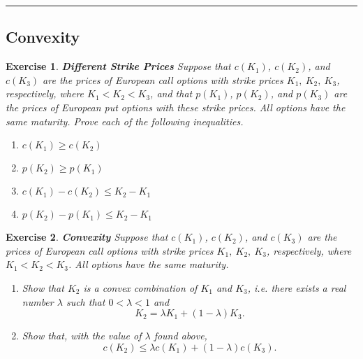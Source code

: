 \documentclass[letterpaper,10pt]{article}
\newtheorem{ex}{Exercise}
\begin{document}
\bigskip

\hrule

\bigskip

\subsection{Convexity}


\begin{ex} {\bf Different Strike Prices}
Suppose that $c(K_1)$, $c(K_2)$, and $c(K_3)$ are the prices of European call options with strike prices $K_1,~K_2,~K_3$, respectively, where $K_1<K_2<K_3$, and that $p(K_1)$, $p(K_2)$, and $p(K_3)$ are the prices of European put options with these strike prices.  All options have the same maturity.  Prove each of the following inequalities.

\begin{enumerate}

\item[(a)] $c(K_1)\geq c(K_2)$

\item[(b)] $p(K_2)\geq p(K_1)$

\item[(c)] $c(K_1)-c(K_2)\leq K_2-K_1$

\item[(d)] $p(K_2)-p(K_1)\leq K_2-K_1$





\end{enumerate}

\end{ex}

\begin{ex}{\bf Convexity}
Suppose that $c(K_1)$, $c(K_2)$, and $c(K_3)$ are the prices of European call options with strike prices $K_1,~K_2,~K_3$, respectively, where $K_1<K_2<K_3$.  All options have the same maturity.  

\begin{enumerate}

\item[(a)] Show that $K_2$ is a convex combination of $K_1$ and $K_3$, i.e. there exists a real number $\lambda$ such that $0<\lambda<1$ and $$K_2=\lambda K_1+(1-\lambda)K_3.$$



\item[(b)] Show that, with the value of $\lambda$ found above, $$c(K_2)\leq \lambda c(K_1)+(1-\lambda)c(K_3).$$

\end{enumerate}

\end{ex}
\end{document}

